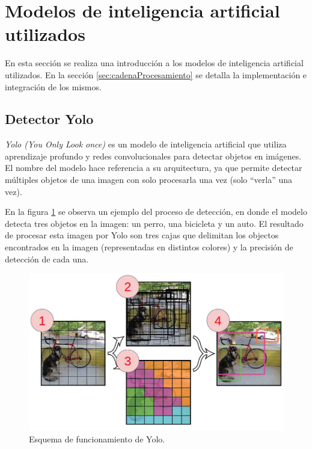 \section{Modelos de inteligencia artificial utilizados}
\label{sec:modelosIA}

En esta sección se realiza una introducción a los modelos de inteligencia artificial utilizados. En la sección \ref{sec:cadenaProcesamiento} se detalla la implementación e integración de los mismos.

\subsection{Detector Yolo}

\textit{Yolo (You Only Look once)} \citep{YOLO_MODELO} es un modelo de inteligencia artificial que utiliza aprendizaje profundo y redes convolucionales para detectar objetos en imágenes. El nombre del modelo hace referencia a su arquitectura, ya que permite detectar múltiples objetos de una imagen con solo procesarla una vez (solo ``verla'' una vez). 

En la figura \ref{fig:diagramaYolo} se observa un ejemplo del proceso de detección, en donde el modelo detecta tres objetos en la imagen: un perro, una bicicleta y un auto. El resultado de procesar esta imagen por Yolo son tres cajas que delimitan los objectos encontrados en la imagen (representadas en distintos colores) y la precisión de detección de cada una.

\begin{figure}[ht]
	\centering
	\includegraphics[scale=.55]{./Figures/yolo.jpg}
	\caption{Esquema de funcionamiento de Yolo\protect\footnotemark.}
	\label{fig:diagramaYolo}
\end{figure}


